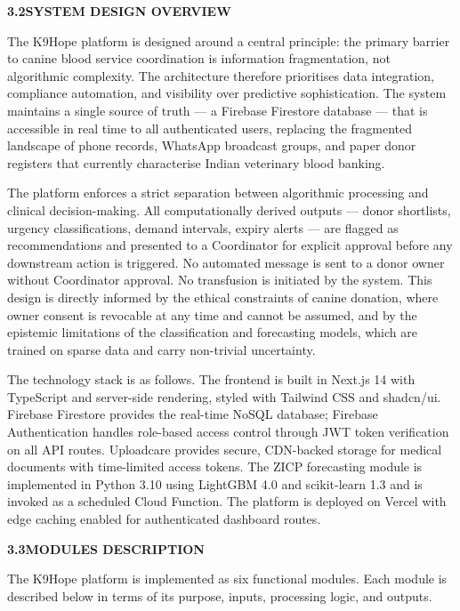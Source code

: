 \documentclass[12pt,a4paper]{article}
\begin{document}
\vspace{1.5em}
\noindent\textbf{3.2\quad SYSTEM DESIGN OVERVIEW}
\vspace{0.6em}

\noindent The K9Hope platform is designed around a central principle: the primary barrier to canine blood service coordination is information fragmentation, not algorithmic complexity. The architecture therefore prioritises data integration, compliance automation, and visibility over predictive sophistication. The system maintains a single source of truth — a Firebase Firestore database — that is accessible in real time to all authenticated users, replacing the fragmented landscape of phone records, WhatsApp broadcast groups, and paper donor registers that currently characterise Indian veterinary blood banking.

\noindent The platform enforces a strict separation between algorithmic processing and clinical decision-making. All computationally derived outputs — donor shortlists, urgency classifications, demand intervals, expiry alerts — are flagged as recommendations and presented to a Coordinator for explicit approval before any downstream action is triggered. No automated message is sent to a donor owner without Coordinator approval. No transfusion is initiated by the system. This design is directly informed by the ethical constraints of canine donation, where owner consent is revocable at any time and cannot be assumed, and by the epistemic limitations of the classification and forecasting models, which are trained on sparse data and carry non-trivial uncertainty.

\noindent The technology stack is as follows. The frontend is built in Next.js 14 with TypeScript and server-side rendering, styled with Tailwind CSS and shadcn/ui. Firebase Firestore provides the real-time NoSQL database; Firebase Authentication handles role-based access control through JWT token verification on all API routes. Uploadcare provides secure, CDN-backed storage for medical documents with time-limited access tokens. The ZICP forecasting module is implemented in Python 3.10 using LightGBM 4.0 and scikit-learn 1.3 and is invoked as a scheduled Cloud Function. The platform is deployed on Vercel with edge caching enabled for authenticated dashboard routes.

\vspace{1.5em}
\noindent\textbf{3.3\quad MODULES DESCRIPTION}
\vspace{0.6em}

\noindent The K9Hope platform is implemented as six functional modules. Each module is described below in terms of its purpose, inputs, processing logic, and outputs.
\end{document}
